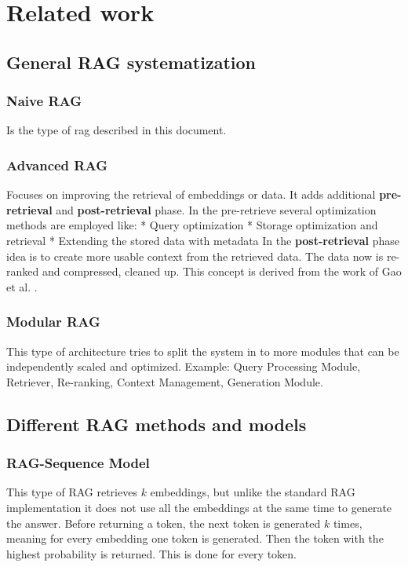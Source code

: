 \documentclass{wseas}
\begin{document}
\section{Related work}

\subsection{General RAG
systematization}

\subsubsection{Naive RAG}

Is the type of rag described in this document.

\subsubsection{Advanced RAG}

Focuses on improving the retrieval of embeddings or data. It adds
additional \textbf{pre-retrieval} and \textbf{post-retrieval} phase. In
the pre-retrieve several optimization methods are employed like: 
* Query
optimization * Storage optimization and retrieval * Extending the stored
data with metadata In the \textbf{post-retrieval} phase idea is to
create more usable context from the retrieved data. The data now is
re-ranked and compressed, cleaned up. This concept is derived from the
work of Gao et al. \cite{cite4}.

\subsubsection{Modular RAG}

This type of architecture tries to split the system in to more modules
that can be independently scaled and optimized. Example: Query
Processing Module, Retriever, Re-ranking, Context Management, Generation
Module.

\subsection{Different RAG methods and
models}

\subsubsection{RAG-Sequence Model}

This type of RAG retrieves \(k\) embeddings, but unlike the standard RAG
implementation it does not use all the embeddings at the same time to
generate the answer. Before returning a token, the next token is
generated \(k\) times, meaning for every embedding one token is
generated. Then the token with the highest probability is returned. This
is done for every token.
\end{document}
